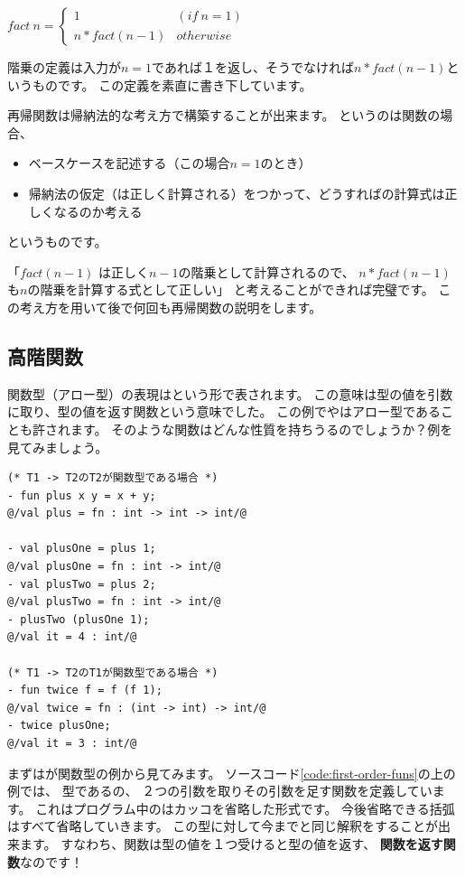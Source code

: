 \documentclass[11pt,a4paper]{article}
\begin{document}
$fact \ n = \begin{cases} 1 & (if \ n = 1) \\ n * fact (n - 1) & otherwise \end{cases}$

階乗の定義は入力が$n=1$であれば１を返し、そうでなければ$n * fact (n - 1)$というものです。
この定義を素直に書き下しています。

再帰関数は帰納法的な考え方で構築することが出来ます。
というのは関数の場合、
\begin{itemize}
\item ベースケースを記述する（この場合$n=1$のとき）
\item 帰納法の仮定（は正しく計算される）をつかって、どうすればの計算式は正しくなるのか考える
\end{itemize}
というものです。

「$fact (n - 1)$ は正しく$n - 1$の階乗として計算されるので、
$n * fact (n - 1)$も$n$の階乗を計算する式として正しい」
と考えることができれば完璧です。
この考え方を用いて後で何回も再帰関数の説明をします。

\subsection{高階関数}
関数型（アロー型）の表現はという形で表されます。
この意味は型の値を引数に取り、型の値を返す関数という意味でした。
この例でやはアロー型であることも許されます。
そのような関数はどんな性質を持ちうるのでしょうか？例を見てみましょう。

\begin{lstlisting}[caption=第一級関数,label=code:first-order-funs]
(* T1 -> T2のT2が関数型である場合 *)
- fun plus x y = x + y;
@/val plus = fn : int -> int -> int/@

- val plusOne = plus 1;
@/val plusOne = fn : int -> int/@
- val plusTwo = plus 2;
@/val plusTwo = fn : int -> int/@
- plusTwo (plusOne 1);
@/val it = 4 : int/@

(* T1 -> T2のT1が関数型である場合 *)
- fun twice f = f (f 1);
@/val twice = fn : (int -> int) -> int/@
- twice plusOne;
@/val it = 3 : int/@
\end{lstlisting}

まずはが関数型の例から見てみます。
ソースコード\ref{code:first-order-funs}の上の例では、
型であるの、
２つの引数を取りその引数を足す関数を定義しています。
これはプログラム中のはカッコを省略した形式です。
今後省略できる括弧はすべて省略していきます。
この型に対して今までと同じ解釈をすることが出来ます。
すなわち、関数は型の値を１つ受けると型の値を返す、
{\bfseries 関数を返す関数}なのです！
\end{document}
